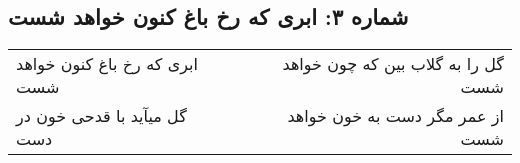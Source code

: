 \begin{center}
\section*{شماره ۳: ابری که رخ باغ کنون خواهد شست}
\label{sec:003}
\begin{longtable}{l p{0.5cm} r}
ابری که رخ باغ کنون خواهد شست
&&
گل را به گلاب بین که چون خواهد شست
\\
گل میآید با قدحی خون در دست
&&
از عمر مگر دست به خون خواهد شست
\\
\end{longtable}
\end{center}
